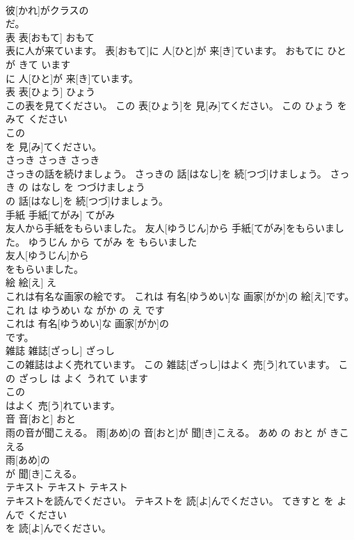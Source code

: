 \documentclass[8pt]{extreport}
\begin{document}
\begin{CJK}{UTF8}{min}
\\	彼[かれ]がクラスの
\\	だ。		
\\	表	表[おもて]	おもて	
\\	表に人が来ています。	表[おもて]に 人[ひと]が 来[き]ています。	おもてに ひと が きて います	
\\	に 人[ひと]が 来[き]ています。		
\\	表	表[ひょう]	ひょう	
\\	この表を見てください。	この 表[ひょう]を 見[み]てください。	この ひょう を みて ください	
\\	この
\\	を 見[み]てください。		
\\	さっき	さっき	さっき	
\\	さっきの話を続けましょう。	さっきの 話[はなし]を 続[つづ]けましょう。	さっき の はなし を つづけましょう	
\\	の 話[はなし]を 続[つづ]けましょう。		
\\	手紙	手紙[てがみ]	てがみ	
\\	友人から手紙をもらいました。	友人[ゆうじん]から 手紙[てがみ]をもらいました。	ゆうじん から てがみ を もらいました	
\\	友人[ゆうじん]から
\\	をもらいました。		
\\	絵	絵[え]	え	
\\	これは有名な画家の絵です。	これは 有名[ゆうめい]な 画家[がか]の 絵[え]です。	これ は ゆうめい な がか の え です	
\\	これは 有名[ゆうめい]な 画家[がか]の
\\	です。		
\\	雑誌	雑誌[ざっし]	ざっし	
\\	この雑誌はよく売れています。	この 雑誌[ざっし]はよく 売[う]れています。	この ざっし は よく うれて います	
\\	この
\\	はよく 売[う]れています。		
\\	音	音[おと]	おと	
\\	雨の音が聞こえる。	雨[あめ]の 音[おと]が 聞[き]こえる。	あめ の おと が きこえる	
\\	雨[あめ]の
\\	が 聞[き]こえる。		
\\	テキスト	テキスト	テキスト	
\\	テキストを読んでください。	テキストを 読[よ]んでください。	てきすと を よんで ください	
\\	を 読[よ]んでください。		

\end{CJK}
\end{document}
